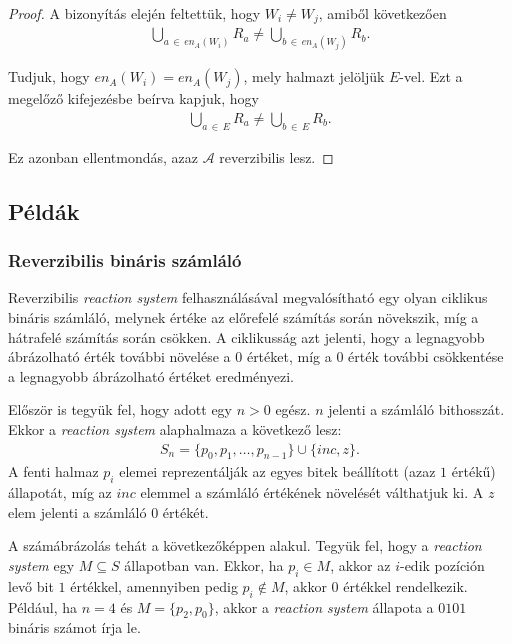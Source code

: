 \documentclass[12pt]{article}
\theoremstyle{definition}
\theoremstyle{remark}
\theoremstyle{plain}
\theoremstyle{plain}
\newcommand{\en}{\textit{en}}
\begin{document}
\begin{proof}
        A bizonyítás elején feltettük, hogy $W_{i} \neq W_{j}$, amiből következően
        \begin{align*}
            \bigcup\limits_{a \,\in\, \en_{A}(W_{i})} R_{a} \neq \bigcup\limits_{b \,\in\, \en_{A}(W_{j})} R_{b}.
        \end{align*}

        Tudjuk, hogy $\en_{A}(W_{i}) = \en_{A}(W_{j})$, mely halmazt jelöljük $E$-vel. Ezt a megelőző kifejezésbe beírva kapjuk, hogy
        \begin{align*}
            \bigcup\limits_{a \,\in\, E} R_{a} \neq \bigcup\limits_{b \,\in\, E} R_{b}.
        \end{align*}
        
        Ez azonban ellentmondás, azaz $\mathscr{A}$ reverzibilis lesz.
    \end{proof}

    \subsection*{Példák}

    \subsubsection*{Reverzibilis bináris számláló}

    Reverzibilis \textit{reaction system} felhasználásával megvalósítható egy olyan ciklikus bináris számláló, melynek értéke az előrefelé számítás során növekszik, míg a hátrafelé számítás során csökken. A ciklikusság azt jelenti, hogy a legnagyobb ábrázolható érték további növelése a $0$ értéket, míg a $0$ érték további csökkentése a legnagyobb ábrázolható értéket eredményezi.

    Először is tegyük fel, hogy adott egy $n > 0$ egész. $n$ jelenti a számláló bithosszát. Ekkor a \textit{reaction system} alaphalmaza a következő lesz:
    \begin{align*}
        S_{n} = \{ p_{0}, p_{1}, \ldots, p_{n - 1}\} \cup \{ \textit{inc}, z \}.
    \end{align*}
    A fenti halmaz $p_{i}$ elemei reprezentálják az egyes bitek beállított (azaz $1$ értékű) állapotát, míg az $\textit{inc}$ elemmel a számláló értékének növelését válthatjuk ki. A $z$ elem jelenti a számláló $0$ értékét.

    A számábrázolás tehát a következőképpen alakul. Tegyük fel, hogy a \textit{reaction system} egy $M \subseteq S$ állapotban van. Ekkor, ha $p_{i} \in M$, akkor az $i$-edik pozíción levő bit $1$ értékkel, amennyiben pedig $p_{i} \notin M$, akkor $0$ értékkel rendelkezik. Például, ha $n = 4$ és $M = \{p_{2}, p_{0}\}$, akkor a \textit{reaction system} állapota a $0101$ bináris számot írja le.
    
\end{document}
